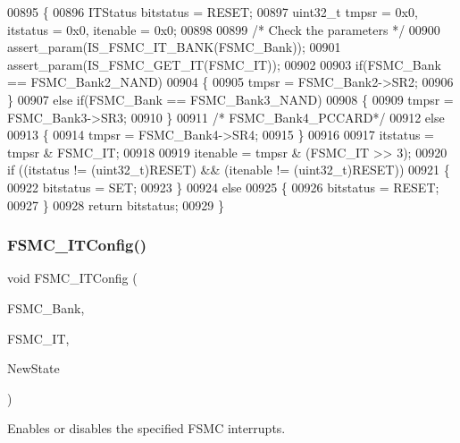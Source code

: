 \begin{DoxyCode}
00895 \{
00896   ITStatus bitstatus = RESET;
00897   uint32\_t tmpsr = 0x0, itstatus = 0x0, itenable = 0x0; 
00898   
00899   \textcolor{comment}{/* Check the parameters */}
00900   assert_param(IS_FSMC_IT_BANK(FSMC\_Bank));
00901   assert_param(IS_FSMC_GET_IT(FSMC\_IT));
00902   
00903   \textcolor{keywordflow}{if}(FSMC\_Bank == FSMC_Bank2_NAND)
00904   \{
00905     tmpsr = FSMC_Bank2->SR2;
00906   \}  
00907   \textcolor{keywordflow}{else} \textcolor{keywordflow}{if}(FSMC\_Bank == FSMC_Bank3_NAND)
00908   \{
00909     tmpsr = FSMC_Bank3->SR3;
00910   \}
00911   \textcolor{comment}{/* FSMC\_Bank4\_PCCARD*/}
00912   \textcolor{keywordflow}{else}
00913   \{
00914     tmpsr = FSMC_Bank4->SR4;
00915   \} 
00916   
00917   itstatus = tmpsr & FSMC\_IT;
00918   
00919   itenable = tmpsr & (FSMC\_IT >> 3);
00920   \textcolor{keywordflow}{if} ((itstatus != (uint32\_t)RESET)  && (itenable != (uint32\_t)RESET))
00921   \{
00922     bitstatus = SET;
00923   \}
00924   \textcolor{keywordflow}{else}
00925   \{
00926     bitstatus = RESET;
00927   \}
00928   \textcolor{keywordflow}{return} bitstatus; 
00929 \}
\end{DoxyCode}
\mbox{\label{group__FSMC__Group4_ga217027ae3cd213b9076b6a1be197064c}} 
\subsubsection{F\+S\+M\+C\+\_\+\+I\+T\+Config()}
{\footnotesize\ttfamily void F\+S\+M\+C\+\_\+\+I\+T\+Config (\begin{DoxyParamCaption}\item[{uint32\+\_\+t}]{F\+S\+M\+C\+\_\+\+Bank,  }\item[{uint32\+\_\+t}]{F\+S\+M\+C\+\_\+\+IT,  }\item[{\textbf{ Functional\+State}}]{New\+State }\end{DoxyParamCaption})}



Enables or disables the specified F\+S\+MC interrupts. 


